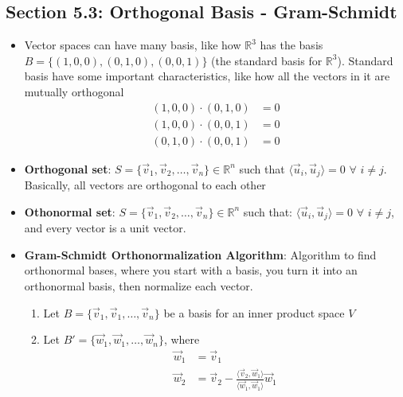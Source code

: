 \documentclass[15pt]{article}
\begin{document}
\begin{flushleft}
\section{\textbf{Section 5.3}: Orthogonal Basis - Gram-Schmidt}
\begin{itemize}
    \item Vector spaces can have many basis, like how $\mathbb{R}^3$ has the
            basis $B = \{ (1,0,0), (0,1,0), (0,0,1) \}$ (the standard basis for
            $\mathbb{R}^3$). Standard basis have some important characteristics,
            like how all the vectors in it are mutually orthogonal
            \begin{align*}
                (1,0,0) \cdot (0,1,0) &= 0 \\
                (1,0,0) \cdot (0,0,1) &= 0 \\
                (0,1,0) \cdot (0,0,1) &= 0
            \end{align*}
    \item \textbf{Orthogonal set}: $S = \{ \vec{v}_1, \vec{v}_2, \ldots, 
            \vec{v}_n \} \in \mathbb{R}^n$ such that $\langle \vec{u}_i,
            \vec{u}_j \rangle = 0$ $\forall$ $i \neq j$. Basically, all vectors 
            are orthogonal to each other
    \item \textbf{Othonormal set}: $S = \{ \vec{v}_1, \vec{v}_2, \ldots, 
            \vec{v}_n \} \in \mathbb{R}^n$ such that: $\langle \vec{u}_i,
            \vec{u}_j \rangle = 0$ $\forall$ $i \neq j$, and every vector is a
            unit vector.
    \item \textbf{Gram-Schmidt Orthonormalization Algorithm}: Algorithm to find 
            orthonormal bases, where you start with a basis, you turn it into an
            orthonormal basis, then normalize each vector.
            \begin{enumerate}
                \item Let $B = \{ \vec{v}_1, \vec{v}_1, \ldots, \vec{v}_n \}$ be
                        a basis for an inner product space $V$
                \item Let $B' = \{ \vec{w}_1, \vec{w}_1, \ldots, \vec{w}_n \}$, 
                        where
                        \begin{align*}
                            \vec{w}_1 &= \vec{v}_1                              \\
                            \vec{w}_2 &= \vec{v}_2 - \frac{\langle \vec{v}_2,
                            \vec{w}_1 \rangle}{\langle \vec{w}_1, \vec{w}_1 
                            \rangle} \vec{w}_1                                  \\

\end{align*}
\end{enumerate}
\end{itemize}
\end{flushleft}
\end{document}

